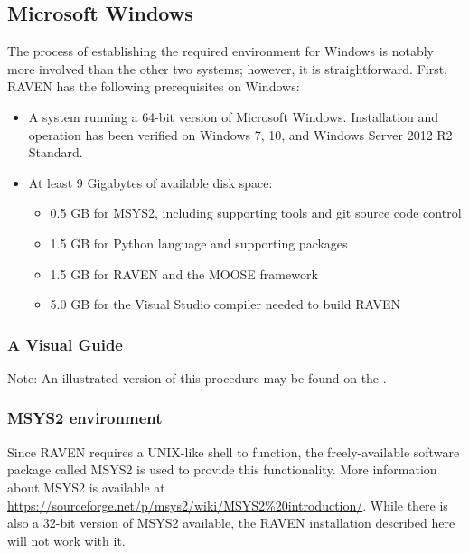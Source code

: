 \subsection{Microsoft Windows}
\label{sec:install windows}

The process of establishing the required environment for Windows is notably more involved than the other two
systems; however, it is straightforward.  First, RAVEN has the following prerequisites on Windows:

\begin{itemize}
    \item A system running a 64-bit version of Microsoft Windows. Installation and operation
        has been verified on Windows 7, 10, and Windows Server 2012 R2 Standard.
    \item At least 9 Gigabytes of available disk space:
    \begin{itemize}
        \item 0.5 GB for MSYS2, including supporting tools and git source code control
        \item 1.5 GB for Python language and supporting packages
        \item 1.5 GB for RAVEN and the MOOSE framework
        \item 5.0 GB for the Visual Studio compiler needed to build RAVEN
    \end{itemize}
\end{itemize}

\subsubsection{A Visual Guide}
Note: An illustrated version of this procedure may be found on the \wiki.

\subsubsection{MSYS2 environment}
Since RAVEN requires a UNIX-like shell to function, the freely-available software package called MSYS2 is
used to
provide this functionality.  More information about MSYS2 is available at
\url{https://sourceforge.net/p/msys2/wiki/MSYS2%20introduction/}.
\nb While there is also a 32-bit version of MSYS2 available, the RAVEN installation described here will not work with it.

